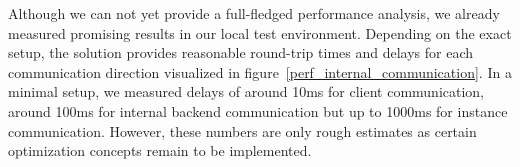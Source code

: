 \documentclass[runningheads]{llncs}
\begin{document}
Although we can not yet provide a full-fledged performance analysis,
we already measured promising results in our local test environment.
Depending on the exact setup,
the solution provides
reasonable round-trip times and delays for each communication direction
visualized in figure~\ref{perf_internal_communication}.
In a minimal setup, we measured delays of around 10ms for client communication,
around 100ms for internal backend communication
but up to 1000ms for instance communication.
However, these numbers are only rough estimates
as certain optimization concepts remain to be implemented.
\end{document}
